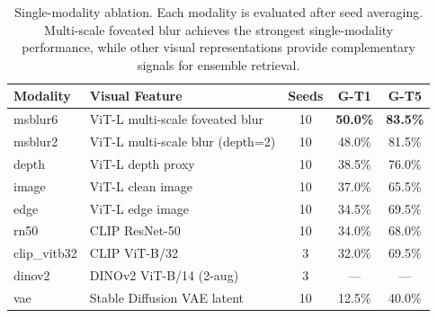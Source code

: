 \begin{table}[htbp]
\centering
\caption{Single-modality ablation. Each modality is evaluated after seed averaging. Multi-scale foveated blur achieves the strongest single-modality performance, while other visual representations provide complementary signals for ensemble retrieval.}
\label{tab:single_modality}
\begin{tabular}{llccc}
\toprule
\textbf{Modality} & \textbf{Visual Feature} & \textbf{Seeds} & \textbf{G-T1} & \textbf{G-T5} \\
\midrule
msblur6 & ViT-L multi-scale foveated blur & 10 & \textbf{50.0\%} & \textbf{83.5\%} \\
msblur2 & ViT-L multi-scale blur (depth=2) & 10 & 48.0\% & 81.5\% \\
depth & ViT-L depth proxy & 10 & 38.5\% & 76.0\% \\
image & ViT-L clean image & 10 & 37.0\% & 65.5\% \\
edge & ViT-L edge image & 10 & 34.5\% & 69.5\% \\
rn50 & CLIP ResNet-50 & 10 & 34.0\% & 68.0\% \\
clip\_vitb32 & CLIP ViT-B/32 & 3 & 32.0\% & 69.5\% \\
dinov2 & DINOv2 ViT-B/14 (2-aug) & 3 & --- & --- \\
vae & Stable Diffusion VAE latent & 10 & 12.5\% & 40.0\% \\
\bottomrule
\end{tabular}
\end{table}

